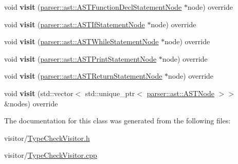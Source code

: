 \begin{DoxyCompactItemize}
void {\bfseries visit} (\hyperlink{classparser_1_1ast_1_1ASTFunctionDeclStatementNode}{parser\+::ast\+::\+A\+S\+T\+Function\+Decl\+Statement\+Node} $\ast$node) override
\item 
\mbox{\label{classvisitor_1_1TypeCheckVisitor_aa1b9cb2bd491d8935a50ebbccbd6924f}} 
void {\bfseries visit} (\hyperlink{classparser_1_1ast_1_1ASTIfStatementNode}{parser\+::ast\+::\+A\+S\+T\+If\+Statement\+Node} $\ast$node) override
\item 
\mbox{\label{classvisitor_1_1TypeCheckVisitor_a12b12e28530f7583c06bd1c81d985bb6}} 
void {\bfseries visit} (\hyperlink{classparser_1_1ast_1_1ASTWhileStatementNode}{parser\+::ast\+::\+A\+S\+T\+While\+Statement\+Node} $\ast$node) override
\item 
\mbox{\label{classvisitor_1_1TypeCheckVisitor_a8b5c1e82bf98754ad0002d103d78f18c}} 
void {\bfseries visit} (\hyperlink{classparser_1_1ast_1_1ASTPrintStatementNode}{parser\+::ast\+::\+A\+S\+T\+Print\+Statement\+Node} $\ast$node) override
\item 
\mbox{\label{classvisitor_1_1TypeCheckVisitor_a308b8168805e875e55afcf2702fd4a31}} 
void {\bfseries visit} (\hyperlink{classparser_1_1ast_1_1ASTReturnStatementNode}{parser\+::ast\+::\+A\+S\+T\+Return\+Statement\+Node} $\ast$node) override
\item 
\mbox{\label{classvisitor_1_1TypeCheckVisitor_a2c643169fd31a00116ae3cc45c5faec4}} 
void {\bfseries visit} (std\+::vector$<$ std\+::unique\+\_\+ptr$<$ \hyperlink{classparser_1_1ast_1_1ASTNode}{parser\+::ast\+::\+A\+S\+T\+Node} $>$$>$ \&nodes) override
\end{DoxyCompactItemize}


The documentation for this class was generated from the following files\+:\begin{DoxyCompactItemize}
\item 
visitor/\hyperlink{TypeCheckVisitor_8h}{Type\+Check\+Visitor.\+h}\item 
visitor/\hyperlink{TypeCheckVisitor_8cpp}{Type\+Check\+Visitor.\+cpp}\end{DoxyCompactItemize}

